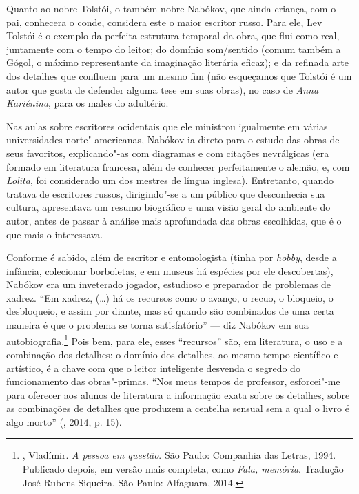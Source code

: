 Quanto ao nobre Tolstói, o também nobre Nabókov, que ainda criança,
com o pai, conhecera o conde, considera este o maior escritor
russo. Para ele, Lev Tolstói é o exemplo da perfeita estrutura temporal da obra, que
flui como real, juntamente com o tempo do leitor; do domínio som/sentido
(comum também a Gógol, o máximo representante da imaginação literária
eficaz); e da refinada arte dos detalhes que confluem para um mesmo fim (não
esqueçamos que Tolstói é um autor que gosta de defender alguma tese em suas
obras), no caso de \emph{Anna Kariénina}, para os males do adultério.

Nas aulas sobre escritores ocidentais que ele ministrou igualmente em
várias universidades norte"-americanas, Nabókov ia direto para o estudo das
obras de seus favoritos, explicando"-as com diagramas e com citações
nevrálgicas (era formado em literatura francesa, além de conhecer
perfeitamente o alemão, e, com \emph{Lolita}, foi considerado um dos
mestres de língua inglesa). Entretanto, quando tratava de escritores
russos, dirigindo"-se a um público que desconhecia sua
cultura, apresentava um resumo biográfico e uma visão geral do ambiente
do autor, antes de passar à análise mais aprofundada das
obras escolhidas, que é o que mais o interessava.

Conforme é sabido, além de escritor e entomologista (tinha por
\emph{hobby}, desde a infância, colecionar borboletas, e em museus
há espécies por ele descobertas), Nabókov era um inveterado
jogador, estudioso e preparador de problemas de xadrez. ``Em xadrez,
(\ldots{}) há os recursos como o avanço, o recuo, o bloqueio, o desbloqueio, e
assim por diante, mas só quando são combinados de uma certa maneira é
que o problema se torna satisfatório'' --- diz Nabókov em sua
autobiografia.\footnote{, Vladímir. \emph{A pessoa em questão}. São Paulo: Companhia das Letras, 1994.
Publicado depois, em versão mais completa, como \emph{Fala, memória}. Tradução José Rubens Siqueira. São Paulo: Alfaguara, 2014.} Pois bem,
para ele, esses ``recursos'' são, em literatura, o uso e a combinação
dos detalhes: o domínio dos detalhes, ao mesmo tempo científico e
artístico, é a chave com que o leitor inteligente desvenda o segredo
do funcionamento das obras"-primas. ``Nos meus tempos de professor,
esforcei"-me para oferecer aos alunos de literatura a informação exata
sobre os detalhes, sobre as combinações de detalhes que produzem a
centelha sensual sem a qual o livro é algo morto'' (, 2014, p. 15).

